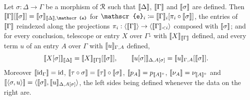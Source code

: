 \begin{corollary}\label{cor:interpretation-natural}
    Let $\sigma : \Delta \to \Gamma$ be a morphism of $\mathcal{R}$ such that $\llbracket\Delta\rrbracket$, $\llbracket\Gamma\rrbracket$ and $\llbracket\sigma\rrbracket$ are defined. Then $\sem{\Gamma}[\sem{\sigma}] = \sem{\sigma}_{\sem{\Delta}, \mathscr{e}}$ for $\mathscr{e}_i \coloneqq \sem{\Gamma}_i[\pi_i \circ \sem{\sigma}]$, the entries of $\llbracket\Gamma\rrbracket$ reindexed along the projections $\pi_i : \langle \llbracket\Gamma\rrbracket \rangle \to \langle \llbracket\Gamma\rrbracket_{<i} \rangle$ composed with $\llbracket\sigma\rrbracket$; and for every conclusion, telescope or entry $X$ over $\Gamma^{\downarrow}$ with $\llbracket X\rrbracket_{\llbracket\Gamma\rrbracket}$ defined, and every term $u$ of an entry $A$ over $\Gamma$ with $\llbracket u\rrbracket_{\Gamma, A}$ defined,
    \[
        \llbracket X[\sigma]\rrbracket_{\llbracket\Delta\rrbracket} = \llbracket X\rrbracket_{\llbracket\Gamma\rrbracket}[\llbracket\sigma\rrbracket], \qquad \llbracket u[\sigma]\rrbracket_{\Delta, A[\sigma]} = \llbracket u\rrbracket_{\Gamma, A}[\llbracket\sigma\rrbracket].
    \]
    Moreover $\llbracket\mathrm{id}_\Gamma\rrbracket = \mathrm{id}$, $\llbracket\tau \circ \sigma\rrbracket = \llbracket\tau\rrbracket \circ \llbracket\sigma\rrbracket$, $\llbracket p_A\rrbracket = p_{\llbracket A\rrbracket^{\circ}}$, $\llbracket\nu_A\rrbracket = \nu_{\llbracket A\rrbracket^{\circ}}$ and $\llbracket\langle \sigma, u \rangle\rrbracket = \langle \llbracket\sigma\rrbracket, \llbracket u\rrbracket_{\Delta, A[\sigma]} \rangle$, the left sides being defined whenever the data on the right are.
\end{corollary}

